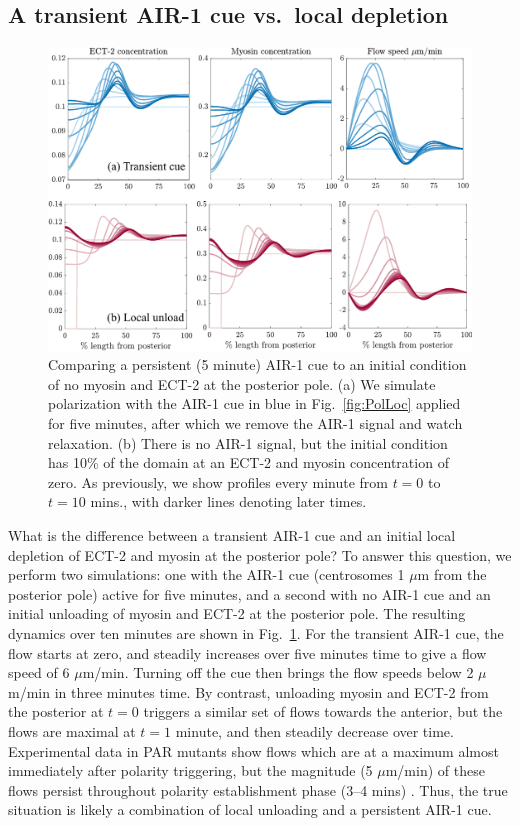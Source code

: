 \documentclass[11pt]{article}
\begin{document}
\subsection{A transient AIR-1 cue vs.\ local depletion}
\begin{figure}
\centering
\includegraphics[width=\textwidth]{Glotzer/Fig7/Fig7-crop.pdf}
\caption{\label{fig:CueVsIC}Comparing a persistent (5 minute) AIR-1 cue to an initial condition of no myosin and ECT-2 at the posterior pole. (a) We simulate polarization with the AIR-1 cue in blue in Fig.\ \ref{fig:PolLoc} applied for five minutes, after which we remove the AIR-1 signal and watch relaxation. (b) There is no AIR-1 signal, but the initial condition has 10\% of the domain at an ECT-2 and myosin concentration of zero. As previously, we show profiles every minute from $t=0$ to $t=10$ mins., with darker lines denoting later times.}
\end{figure}

What is the difference between a transient AIR-1 cue and an initial local depletion of ECT-2 and myosin at the posterior pole? To answer this question, we perform two simulations: one with the AIR-1 cue (centrosomes 1 $\mu$m from the posterior pole) active for five minutes, and a second with no AIR-1 cue and an initial unloading of myosin and ECT-2 at the posterior pole. The resulting dynamics over ten minutes are shown in Fig.\ \ref{fig:CueVsIC}. For the transient AIR-1 cue, the flow starts at zero, and steadily increases over five minutes time to give a flow speed of 6 $\mu$m/min. Turning off the cue then brings the flow speeds below 2 $\mu$m/min in three minutes time. By contrast, unloading myosin and ECT-2 from the posterior at $t=0$ triggers a similar set of flows towards the anterior, but the flows are maximal at $t=1$ minute, and then steadily decrease over time. Experimental data in PAR mutants show flows which are at a maximum almost immediately after polarity triggering, but the magnitude (5 $\mu$m/min) of these flows persist throughout polarity establishment phase (3--4 mins) \citep[Fig.~2G]{gross2019guiding}. Thus, the true situation is likely a combination of local unloading and a persistent AIR-1 cue. 
\end{document}
